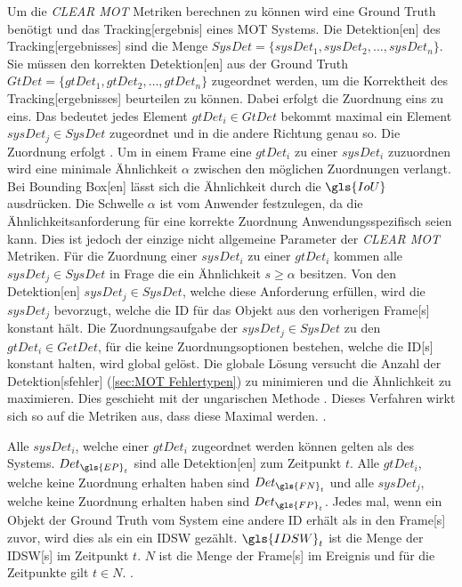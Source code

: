 Um die \textit{\acrshort{CLEAR} \gls{MOT}} Metriken berechnen zu können wird eine \gls{Ground Truth} benötigt und das \gls{Tracking}[ergebnis] eines \gls{MOT} Systems. Die \gls{Detektion}[en] des \gls{Tracking}[ergebnisses] sind die Menge \(SysDet = \{sysDet_1, sysDet_2, \dots, sysDet_n\}\). Sie müssen den korrekten \gls{Detektion}[en] aus der \gls{Ground Truth} \(GtDet = \{gtDet_1, gtDet_2, \dots, gtDet_n\}\) zugeordnet werden, um die Korrektheit des \gls{Tracking}[ergebnisses] beurteilen zu können. Dabei erfolgt die Zuordnung eins zu eins. Das bedeutet jedes Element \(gtDet_i \in GtDet\) bekommt maximal ein Element \(sysDet_j \in SysDet\) zugeordnet und in die andere Richtung genau so. Die Zuordnung erfolgt . Um in einem \gls{Frame} eine \(gtDet_i\) zu einer \(sysDet_i\) zuzuordnen wird eine minimale Ähnlichkeit \(\alpha\) zwischen den möglichen Zuordnungen verlangt. Bei \gls{Bounding Box}[en] lässt sich die Ähnlichkeit durch die \(\gls{IoU}\) ausdrücken. Die Schwelle \(\alpha\) ist vom Anwender festzulegen, da die Ähnlichkeitsanforderung für eine korrekte Zuordnung Anwendungsspezifisch seien kann. Dies ist jedoch der einzige nicht allgemeine Parameter der \textit{\acrshort{CLEAR} \gls{MOT}} Metriken. Für die Zuordnung einer \(sysDet_i\) zu einer \(gtDet_i\) kommen alle \(sysDet_j \in SysDet\) in Frage die ein Ähnlichkeit \(s \geq \alpha\) besitzen. Von den \gls{Detektion}[en] \(sysDet_j \in SysDet\), welche diese Anforderung erfüllen, wird die \(sysDet_j\) bevorzugt, welche die \acrshort{ID} für das Objekt aus den vorherigen \gls{Frame}[s] konstant hält. Die Zuordnungsaufgabe der \(sysDet_j \in SysDet\) zu den  \(gtDet_i \in GetDet\), für die keine Zuordnungsoptionen bestehen, welche die \acrshort{ID}[s] konstant halten, wird global gelöst. Die globale Lösung versucht die Anzahl der \gls{Detektion}[sfehler] (\ref{sec:MOT Fehlertypen}) zu minimieren und die Ähnlichkeit zu maximieren. Dies geschieht mit der ungarischen Methode \cite{Kuhn.1955}. Dieses Verfahren wirkt sich so auf die Metriken aus, dass diese Maximal werden. \cite{CLEAR.2008, HOTA}. \par

Alle \(sysDet_i\), welche einer \(gtDet_i\) zugeordnet werden können gelten als  des Systems. \(Det_{\gls{EP}_t}\) sind alle  \gls{Detektion}[en] zum Zeitpunkt \(t\). Alle \(gtDet_i\), welche keine Zuordnung erhalten haben sind  \(Det_{\gls{FN}_t}\) und alle \(sysDet_j\), welche keine Zuordnung erhalten haben sind  \(Det_{\gls{FP}_t}\). Jedes mal, wenn ein Objekt der \gls{Ground Truth} vom System eine andere \acrshort{ID} erhält als in den \gls{Frame}[s] zuvor, wird dies als ein ein \gls{IDSW} gezählt. \(\gls{IDSW}_t\) ist die Menge der \gls{IDSW}[s] im Zeitpunkt \(t\). \(N\) ist die Menge der \gls{Frame}[s] im \gls{Ereignis} und für die Zeitpunkte gilt \(t \in N\). \cite{CLEAR.2008, IDF1}. \par

